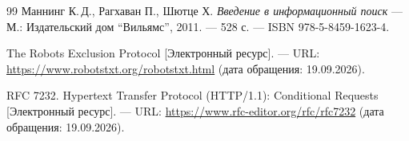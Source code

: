 \begin{thebibliography}{99}
Маннинг К.\,Д., Рагхаван П., Шютце Х.
{\itshape Введение в информационный поиск} --- М.: Издательский дом \enquote{Вильямс},
2011. --- 528 с. --- ISBN 978-5-8459-1623-4.

The Robots Exclusion Protocol [Электронный ресурс]. --- URL:
\href{https://www.robotstxt.org/robotstxt.html}{https://www.robotstxt.org/robotstxt.html}
(дата обращения: 19.09.2026).

RFC 7232. Hypertext Transfer Protocol (HTTP/1.1): Conditional Requests
[Электронный ресурс]. --- URL:
\href{https://www.rfc-editor.org/rfc/rfc7232}{https://www.rfc-editor.org/rfc/rfc7232}
(дата обращения: 19.09.2026).
\end{thebibliography}
